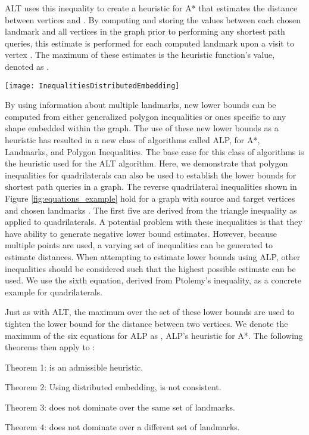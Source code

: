 \documentclass{siam-wns-article}
\begin{document}
ALT uses this inequality to create a heuristic for A* that estimates the distance between vertices  and . By computing and storing the values between each chosen landmark and all vertices in the graph prior to performing any shortest path queries, this estimate is performed for each computed landmark upon a visit to vertex . The maximum of these estimates is the heuristic function's value, denoted as .
\par
\begin{figure*}
\centering
\texttt{[image: InequalitiesDistributedEmbedding]}
\caption{Dual landmark ALP heuristic inequalities(left) and a labeling example for distributed embedding on a graph (right)}
\label{fig:equations_example}
\end{figure*}
\par
By using information about multiple landmarks, new lower bounds can be computed from either generalized polygon inequalities or ones specific to any shape embedded within the graph. The use of these new lower bounds as a heuristic has resulted in a new class of algorithms called ALP, for A*, Landmarks, and Polygon Inequalities. The base case for this class of algorithms is the heuristic used for the ALT algorithm. Here, we demonstrate that polygon inequalities for quadrilaterals can also be used to establish the lower bounds for shortest path queries in a graph. The reverse quadrilateral inequalities shown in Figure \ref{fig:equations_example} hold for a graph  with source and target vertices  and chosen landmarks . The first five are derived from the triangle inequality as applied to quadrilaterals. A potential problem with these inequalities is that they have ability to generate negative lower bound estimates. However, because multiple points are used, a varying set of inequalities can be generated to estimate distances. When attempting to estimate lower bounds using ALP, other inequalities should be considered such that the highest possible estimate can be used. We use the sixth equation, derived from Ptolemy's inequality, as a concrete example for quadrilaterals.
\par
Just as with ALT, the maximum over the set of these lower bounds are used to tighten the lower bound for the distance between two vertices. We denote the maximum of the six equations for ALP as , ALP's heuristic for A*. The following theorems then apply to :
\begin{description}
  \item Theorem 1:  is an admissible heuristic.
  \item Theorem 2: Using distributed embedding,  is not consistent.
  \item Theorem 3:  does not dominate  over the same set of landmarks.
  \item Theorem 4:  does not dominate  over a different set of landmarks.
\end{description}
\end{document}
